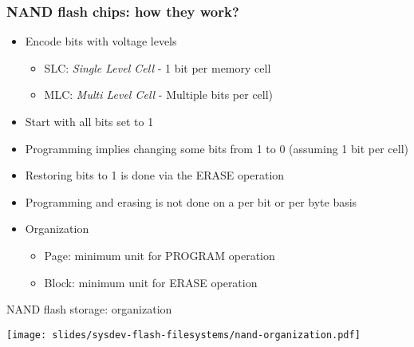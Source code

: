 \begin{frame}
  \frametitle{NAND flash chips: how they work?}
  \begin{itemize}
  \item Encode bits with voltage levels
    \begin{itemize}
      \item SLC: {\em Single Level Cell} - 1 bit per memory cell
      \item MLC: {\em Multi Level Cell} - Multiple bits per cell)
    \end{itemize}
  \item Start with all bits set to 1
  \item Programming implies changing some bits from 1 to 0
        (assuming 1 bit per cell)
  \item Restoring bits to 1 is done via the ERASE operation
  \item Programming and erasing is not done on a per bit or per byte
    basis
  \item Organization
    \begin{itemize}
    \item Page: minimum unit for PROGRAM operation
    \item Block: minimum unit for ERASE operation
    \end{itemize}
  \end{itemize}
\end{frame}

\begin{frame}{NAND flash storage: organization}
  \begin{center}
    \texttt{[image: slides/sysdev-flash-filesystems/nand-organization.pdf]}
  \end{center}
\end{frame}

